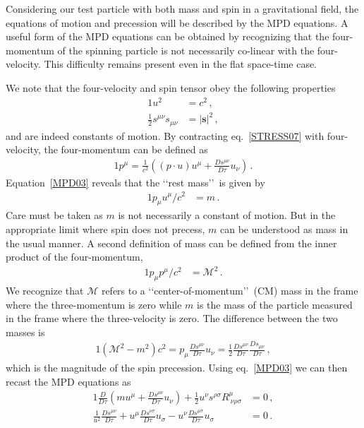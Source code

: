 Considering our test particle with both mass and spin in a gravitational field, the equations of motion and precession will be described by the MPD equations. A useful form of the MPD equations can be obtained by recognizing that the four-momentum of the spinning particle is not necessarily co-linear with the four-velocity. This difficulty remains present even in the flat space-time case.

We note that the four-velocity and spin tensor obey the following properties
\begin{alignat}{1}
  \label{MPD01} u^{2}&=c^{2}\,,\\
  \label{MPD02} \frac{1}{2}s^{\mu\nu}s_{\mu\nu}&=\left|\mathbf{s}\right|^{2}\,,
\end{alignat}
and are indeed constants of motion. By contracting eq.~\eqref{STRESS07} with four-velocity, the four-momentum can be defined as
\begin{alignat}{1}
  \label{MPD03} p^{\mu}=\frac{1}{c^{2}}\left((p\cdot u)u^{\mu}+\frac{Ds^{\mu\nu}}{D\tau}u_{\nu}\right)\,.
\end{alignat} 
Equation~\eqref{MPD03} reveals that the \lq\lq rest mass\rq\rq\ is given by
\begin{alignat}{1}
  \label{MPD04} p_{\mu}u^{\mu}/c^{2}&=m\,.
\end{alignat}
Care must be taken as $m$ is not necessarily a constant of motion. But in the appropriate limit where spin does not precess, $m$ can be understood as mass in the usual manner. A second definition of mass can be defined from the inner product of the four-momentum,
\begin{alignat}{1}
  \label{MPD05} p_{\mu}p^{\mu}/c^{2}&=\mathcal{M}^{2}\,.
\end{alignat}
We recognize that $\mathcal{M}$ refers to a \lq\lq center-of-momentum\rq\rq\ (CM) mass in the frame where the three-momentum is zero while $m$ is the mass of the particle measured in the frame where the three-velocity is zero. The difference between the two masses is
\begin{alignat}{1}
  \label{MPD06} (\mathcal{M}^{2}-m^{2})c^{2}=p_{\mu}\frac{Ds^{\mu\nu}}{D\tau}u_{\nu}=\frac{1}{2}\frac{Ds^{\mu\nu}}{D\tau}\frac{Ds_{\mu\nu}}{D\tau}\,,
\end{alignat}
which is the magnitude of the spin precession. Using eq.~\eqref{MPD03} we can then recast the MPD equations as
\begin{alignat}{1}
  \label{MPD07} \frac{D}{D\tau}\left(mu^{\mu}+\frac{Ds^{\mu\nu}}{D\tau}u_{\nu}\right)+\frac{1}{2}u^{\nu}s^{\rho\sigma}R^{\mu}_{\ \nu\rho\sigma}&=0\,,\\
  \label{MPD08} \frac{1}{u^{2}}\frac{Ds^{\mu\nu}}{D\tau}+u^{\mu}\frac{Ds^{\nu\sigma}}{D\tau}u_{\sigma}-u^{\nu}\frac{Ds^{\mu\sigma}}{D\tau}u_{\sigma}&=0\,.
\end{alignat}
